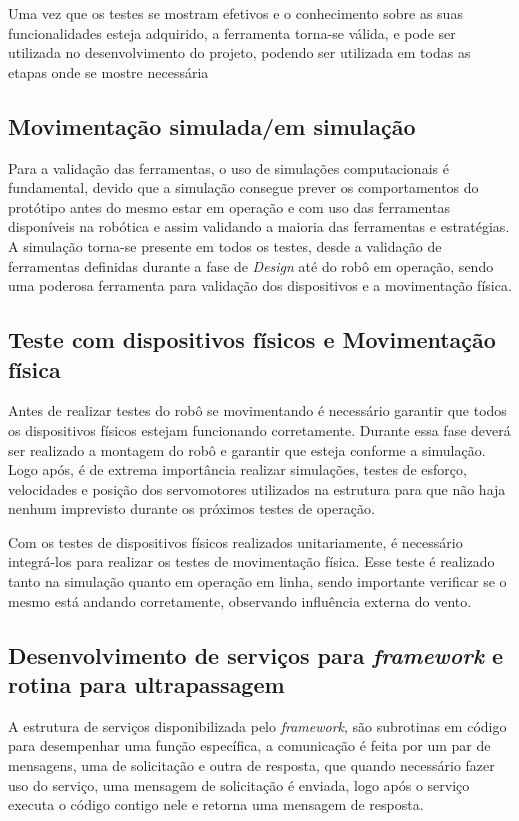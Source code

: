 Uma vez que os testes se mostram efetivos e o conhecimento sobre as suas funcionalidades esteja adquirido, a ferramenta torna-se válida, e pode ser utilizada no desenvolvimento do projeto, podendo ser utilizada em todas as etapas onde se mostre necessária

\subsection{Movimentação simulada/em simulação}
\label{ssec:mov_sim}
Para a validação das ferramentas, o uso de simulações computacionais é fundamental, devido que a simulação consegue prever os comportamentos do protótipo antes do mesmo estar em operação e com uso das ferramentas disponíveis na robótica e assim validando a maioria das ferramentas e estratégias. A simulação torna-se presente em todos os testes, desde a validação de ferramentas definidas durante a fase de \textit{Design} até do robô em operação, sendo uma poderosa ferramenta para validação dos dispositivos e a movimentação física.

\subsection{Teste com dispositivos físicos e Movimentação física}
\label{ssec:test_fis}
Antes de realizar testes do robô se movimentando é necessário garantir que todos os dispositivos físicos estejam funcionando corretamente. Durante essa fase deverá ser realizado a montagem do robô e garantir que esteja conforme a simulação. Logo após, é de extrema importância realizar simulações, testes de esforço, velocidades e posição dos servomotores utilizados na estrutura para que não haja nenhum imprevisto durante os próximos testes de operação. 

Com os testes de dispositivos físicos realizados unitariamente, é necessário integrá-los para realizar os testes de movimentação física. Esse teste é realizado tanto na simulação quanto em operação em linha, sendo importante verificar se o mesmo está andando corretamente, observando influência externa do vento. 

\subsection{Desenvolvimento de serviços para \textit{framework} e rotina para ultrapassagem}
\label{ssec:serv_ultr}
A estrutura de serviços disponibilizada pelo \textit{framework}, são subrotinas em código para desempenhar uma função específica, a comunicação é feita por um par de mensagens, uma de solicitação e outra de resposta, que quando necessário fazer uso do serviço, uma mensagem de solicitação é enviada, logo após o serviço executa o código contigo nele e retorna uma mensagem de resposta. 

